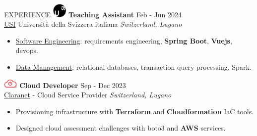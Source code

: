 \documentclass{cv} %
\def\intraexpvspace{0.15cm}
\begin{document}
\begin{minipage}[b][0.9\paperheight][t]{0.7\linewidth}
\begin{rSection}{EXPERIENCE}
    \includegraphics[width=0.7cm, trim={0cm 10cm 0cm 0cm}]{usi-icon.png}
    \hspace*{0cm}\textbf{Teaching Assistant} \hfill Feb - Jun 2024\\
    \hspace*{0.85cm}\href{https://www.usi.ch/}{USI} Università della Svizzera italiana
    \hfill \textit{Switzerland, Lugano}
    \begin{itemize}
        \item \href{https://search.usi.ch/it/corsi/35268192/software-atelier-4-software-engineering-project}{Software Engineering}: 
        requirements engineering, \textbf{Spring Boot}, \textbf{Vuejs}, devops.

        \item \href{https://search.usi.ch/it/corsi/35268184/data-management}{Data Management}: 
        relational databases, transaction query processing, Spark.
    \end{itemize}
    \vspace{\intraexpvspace}
    \vspace{\intraexpvspace}

    \includegraphics[width=0.7cm, trim={0cm 15cm 0cm 0cm}]{claranet-logo.png}
    \textbf{Cloud Developer} \hfill Sep - Dec 2023\\
    \hspace*{0.85cm}\href{https://www.claranet.com/}{Claranet} - Cloud Service Provider
    \hfill \textit{Switzerland, Lugano}
    \begin{itemize}
        \item Provisioning infrastructure with \textbf{Terraform} and \textbf{Cloudformation}
            IaC tools.

        \item Designed cloud assessment challenges with boto3 and \textbf{AWS} services.
    \end{itemize}
    \vspace{\intraexpvspace}
    \vspace{\intraexpvspace}


\end{rSection}
\end{minipage}
\end{document}
